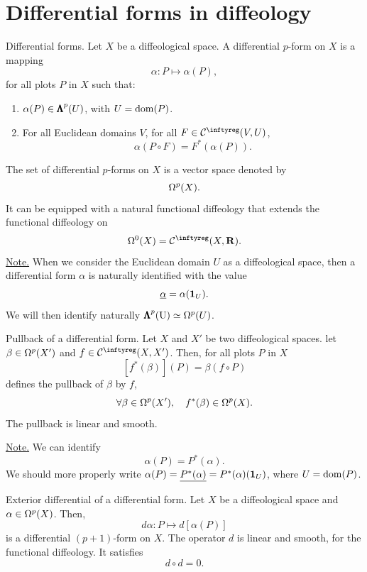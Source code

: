\section{Differential forms in diffeology}

\begin{Article}{Differential forms.}{}
  Let $X$ be a diffeological space.
  A differential $p$-form on $X$ is a mapping
  $$%
    \alpha \colon P \mapsto \alpha(P),
  $$%
  for all plots $P$ in $X$ such that:

  \begin{enumerate}
    \item $\alpha(P) \in {\pmb{\Lambda}}^p(U)$,
    with $U = \mathrm{dom}(P)$.
    \item For all Euclidean domains $V$,
    for all $F \in \Cinfty(V,U)$,
    $$%
      \alpha(P \circ F) = F^*(\alpha(P)).
    $$%
  \end{enumerate}

  The set of differential $p$-forms on $X$ is a vector space denoted by
  $$%
    \DForms^p(X).
  $$%
  It can be equipped with a natural functional diffeology that extends the functional diffeology on
  $$%
    \DForms^0(X) = \Cinfty(X,\RR).
  $$%
  \uline{Note.} When we consider the Euclidean domain $U$ as a diffeological space,
  then a differential form $\alpha$ is naturally identified with the value
  $$%
    \underline{\alpha} = \alpha(\Id_{U}).
  $$%
  We will then identify naturally ${\pmb{\Lambda}}^p(\mathrm{U}) \simeq \Omega^p(U)$.
\end{Article}

\begin{Article}{Pullback of a differential form.}{}
  Let $X$ and $X'$ be two diffeological spaces.
  let $\beta \in \Omega^p(X')$ and $f \in \Cinfty(X,X')$.
  Then,
  for all plots $P$ in $X$
  $$%
    [f^*(\beta)](P) = \beta(f \circ P)
  $$%
  defines the pullback of $\beta$ by $f$,
  $$%
    \forall \beta \in \DForms^p(X'), \quad f^*(\beta) \in \DForms^p(X).
  $$%
  The pullback is linear and smooth.

  \uline{Note.} We can identify
  $$%
    \alpha(P) = P^*(\alpha).
  $$%
  We should more properly write $\alpha(P) = \uline{P^*(\alpha)} = P^*(\alpha)(\Id_U)$,
  where $U = \mathrm{dom}(P)$.
\end{Article}

\begin{Article}{Exterior differential of a differential form.}{}
  Let $X$ be a diffeological space and $\alpha \in \Omega^p(X)$.
  Then,
  $$%
    d\alpha \colon P \mapsto d[\alpha(P)]
  $$%
  is a differential $(p+1)$-form on $X$.
  The operator $d$ is linear and smooth,
  for the functional diffeology.
  It satisfies
  $$%
    d \circ d = 0.
  $$%
\end{Article}

